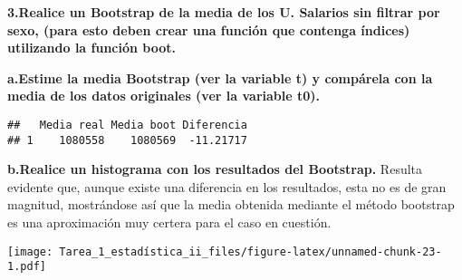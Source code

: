 \documentclass[
]{article}
\newenvironment{Shaded}{\begin{snugshade}}{\end{snugshade}}
\newcommand{\AttributeTok}[1]{\textcolor[rgb]{0.13,0.29,0.53}{#1}}
\newcommand{\FunctionTok}[1]{\textcolor[rgb]{0.13,0.29,0.53}{\textbf{#1}}}
\newcommand{\NormalTok}[1]{#1}
\newcommand{\OtherTok}[1]{\textcolor[rgb]{0.56,0.35,0.01}{#1}}
\newcommand{\SpecialCharTok}[1]{\textcolor[rgb]{0.81,0.36,0.00}{\textbf{#1}}}
\newcommand{\StringTok}[1]{\textcolor[rgb]{0.31,0.60,0.02}{#1}}
\begin{document}
\textbf{3.Realice un Bootstrap de la media de los U. Salarios sin
filtrar por sexo, (para esto deben crear una función que contenga
índices) utilizando la función boot.}

\textbf{a.Estime la media Bootstrap (ver la variable t) y compárela con
la media de los datos originales (ver la variable t0).}

\begin{Shaded}
\end{Shaded}

\begin{verbatim}
##   Media real Media boot Diferencia
## 1    1080558    1080569  -11.21717
\end{verbatim}

\textbf{b.Realice un histograma con los resultados del Bootstrap.}
Resulta evidente que, aunque existe una diferencia en los resultados,
esta no es de gran magnitud, mostrándose así que la media obtenida
mediante el método bootstrap es una aproximación muy certera para el
caso en cuestión.

\begin{Shaded}
\end{Shaded}

\texttt{[image: Tarea\_1\_estadística\_ii\_files/figure-latex/unnamed-chunk-23-1.pdf]}
\end{document}
